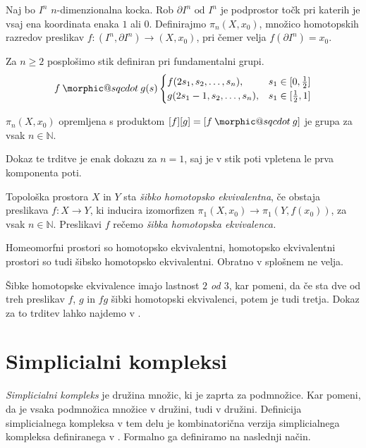 \documentclass[mat1]{fmfdelo}
\makeatletter
\DeclareRobustCommand{\sqcdot}{\mathbin{\mathpalette\morphic@sqcdot\relax}}
\newcommand{\morphic@sqcdot}[2]{%
\sbox\z@{$\m@th#1\centerdot$}%
\ht\z@=.33333\ht\z@
\vcenter{\box\z@}%
}
\newcommand{\N}{\mathbb N}
\makeatother
\begin{document}
Naj bo $I^n$ $n$-dimenzionalna kocka. Rob $\partial I^n \text{ od } I^n$ je podprostor točk pri katerih je vsaj ena koordinata enaka $1$ ali $0$. Definirajmo $\pi_n(X,x_0)$, množico homotopskih razredov preslikav $f:(I^n,\partial I^n) \rightarrow (X,x_0)$, pri čemer velja $f(\partial I^n) = x_0$.

Za $n\ge 2$ posplošimo stik definiran pri fundamentalni grupi.
$$ f\sqcdot g(s) \begin{cases}
f(2s_1,s_2,\ldots,s_n), & s_1\in [0,\frac{1}{2}] \\
g(2s_1-1,s_2,\ldots,s_n), & s_1 \in [\frac{1}{2},1]
\end{cases}
$$


\begin{izrek}
    $\pi_n(X,x_0)$ opremljena s produktom $[f][g] = [f\sqcdot g]$ je grupa za vsak $n \in \N$.
\end{izrek}

Dokaz te trditve je enak dokazu za $n=1$, saj je v stik poti vpletena le prva komponenta poti.

\begin{definicija}
    Topološka prostora $X$ in $Y$ sta \textit{šibko homotopsko ekvivalentna}, če obstaja preslikava $f:X\rightarrow Y$, ki inducira izomorfizen $\pi_1(X,x_0)\rightarrow \pi_1(Y,f(x_0))$, za vsak $n \in \N$. Preslikavi $f$ rečemo \textit{šibka homotopska ekvivalenca.}
\end{definicija}



Homeomorfni prostori so homotopsko ekvivalentni, homotopsko ekvivalentni prostori so tudi šibsko homotopsko ekvivalentni. Obratno v splošnem ne velja.

Šibke homotopske ekvivalence imajo lastnost \textit{$2$ od $3$}, kar pomeni, da če sta dve od treh preslikav $f$, $g$ in $fg$ šibki homotopski ekvivalenci, potem je tudi tretja. Dokaz za to trditev lahko najdemo v \cite{hatcher}.

\section{Simplicialni kompleksi}\label{sec:simpleks}

\textit{Simplicialni kompleks} je družina množic, ki je zaprta za podmnožice. Kar pomeni, da je vsaka podmnožica množice v družini, tudi v družini. Definicija simplicialnega kompleksa v tem delu je kombinatorična verzija simplicialnega kompleksa definiranega v \cite{hatcher}. Formalno ga definiramo na naslednji način.
\end{document}
